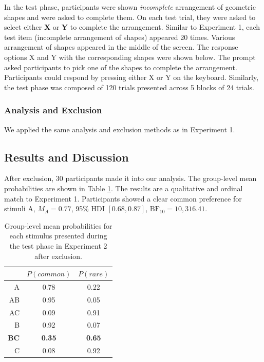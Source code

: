 \documentclass[10pt,letterpaper]{article}
\begin{document}
In the test phase, participants were shown \textit{incomplete} arrangement of geometric shapes and were asked to complete them.
On each test trial, they were asked to select either \textbf{X} or \textbf{Y} to complete the arrangement.
Similar to Experiment 1, each test item (incomplete arrangement of shapes) appeared 20 times.
Various arrangement of shapes appeared in the middle of the screen.
The response options X and Y with the corresponding shapes were shown below.
The prompt asked participants to pick one of the shapes to complete the arrangement.
Participants could respond by pressing either X or Y on the keyboard.
Similarly, the test phase was composed of 120 trials presented across 5 blocks of 24 trials.

\subsubsection{Analysis and Exclusion}

We applied the same analysis and exclusion methods as in Experiment 1.

\subsection{Results and Discussion}

After exclusion, 30 participants made it into our analysis.
The group-level mean probabilities are shown in Table \ref{tab:results-exp2}.
The results are a qualitative and ordinal match to Experiment 1.
Participants showed a clear common preference for stimuli A, $M_{A} = 0.77$, 95\% HDI $[0.68, 0.87]$, $\mathrm{BF}_{10} = 10,316.41$.

\begin{table}[H]
  \begin{center}
    \caption{Group-level mean probabilities for each stimulus presented during the test phase in Experiment 2 after exclusion.\\}
    \label{tab:results-exp2}
    \vskip 0.12in
    \begin{tabular}{rcc}
      \hline
       & $P(common)$ & $P(rare)$ \\
      \hline
      A & 0.78 & 0.22  \\
      AB & 0.95 & 0.05 \\
      AC & 0.09 & 0.91 \\
      B & 0.92 & 0.07  \\
      \textbf{BC} & \textbf{0.35} & \textbf{0.65} \\
      C & 0.08 & 0.92 \\
    \end{tabular}
  \end{center}
\end{table}
\end{document}
